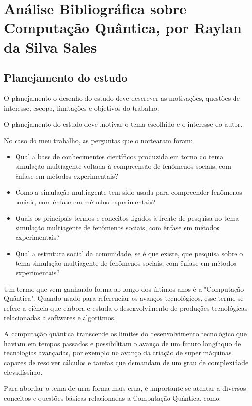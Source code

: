 \chapter{Análise Bibliográfica sobre Computação Quântica, por Raylan da Silva Sales\label{chap:bibliometria:jhcf}}

\section{Planejamento do estudo}

O planejamento o  desenho do estudo deve descrever as motivações, questões de interesse, escopo, limitações e objetivos do trabalho.

O planejamento do estudo deve motivar o tema escolhido e o interesse do autor.

No caso do meu trabalho, as perguntas que o nortearam foram:
\begin{itemize}
    \item Qual a base de conhecimentos científicos produzida em torno do tema simulação multiagente voltada à compreensão de fenômenos sociais, com ênfase em métodos experimentais? 
    \item Como a simulação multiagente tem sido usada para compreender fenômenos sociais, com ênfase em métodos experimentais? 
    \item Quais os principais termos e conceitos ligados à frente de pesquisa no tema simulação multiagente de fenômenos sociais, com ênfase em métodos experimentais? 
    \item Qual a estrutura social da comunidade, se é que existe, que pesquisa sobre o tema simulação multiagente de fenômenos sociais, com ênfase em métodos experimentais?
\end{itemize}

Um termo que vem ganhando forma ao longo dos últimos anos é a "Computação Quântica". Quando usado para referenciar os avanços tecnológicos, esse termo se refere a ciência que elabora e estuda o desenvolvimento de produções tecnológicas relacionadas a softwares e algoritmos. 

A computação quântica transcende os limites do desenvolvimento tecnológico que haviam em tempos passados e possibilitam o avanço de um futuro longínquo de tecnologias avançadas, por exemplo no avanço da criação de super máquinas capazes de resolver cálculos e tarefas que demandam de um grau de complexidade elevadíssimo.

Para abordar o tema de uma forma mais crua, é importante se atentar a diversos conceitos e questões básicas relacionadas a Computação Quântica, como:

